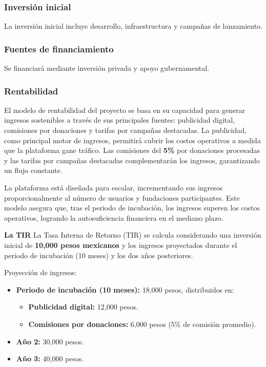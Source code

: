 \documentclass[a4paper,12pt]{article}
\begin{document}
\subsubsection{Inversión inicial}
La inversión inicial incluye desarrollo, infraestructura y campañas de lanzamiento.

\subsubsection{Fuentes de financiamiento}
Se financiará mediante inversión privada y apoyo gubernamental.

\subsubsection{Rentabilidad}
El modelo de rentabilidad del proyecto se basa en su capacidad para generar ingresos sostenibles a través de sus principales fuentes: publicidad digital, comisiones por donaciones y tarifas por campañas destacadas. La publicidad, como principal motor de ingresos, permitirá cubrir los costos operativos a medida que la plataforma gane tráfico. Las comisiones del \textbf{5\%} por donaciones procesadas y las tarifas por campañas destacadas complementarán los ingresos, garantizando un flujo constante.

La plataforma está diseñada para escalar, incrementando sus ingresos proporcionalmente al número de usuarios y fundaciones participantes. Este modelo asegura que, tras el periodo de incubación, los ingresos superen los costos operativos, logrando la autosuficiencia financiera en el mediano plazo.

\textbf{La TIR}
La Tasa Interna de Retorno (TIR) se calcula considerando una inversión inicial de \textbf{10,000 pesos mexicanos} y los ingresos proyectados durante el periodo de incubación (10 meses) y los dos años posteriores.

Proyección de ingresos:
\begin{itemize}\setlength{\itemsep}{0pt}\setlength{\parskip}{1pt}
    \item \textbf{Periodo de incubación (10 meses):} 18,000 pesos, distribuidos en:
    \begin{itemize}\setlength{\itemsep}{0pt}\setlength{\parskip}{0pt}
        \item \textbf{Publicidad digital:} 12,000 pesos.
        \item \textbf{Comisiones por donaciones:} 6,000 pesos (5\% de comisión promedio).
    \end{itemize}
    \item \textbf{Año 2:} 30,000 pesos.
    \item \textbf{Año 3:} 40,000 pesos.
\end{itemize}
\end{document}
